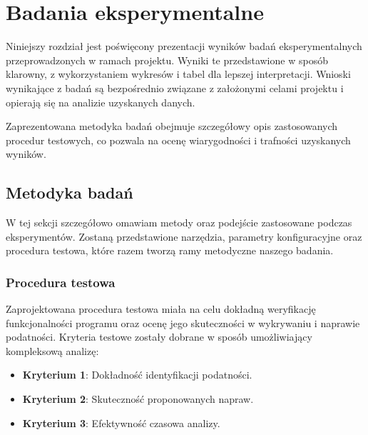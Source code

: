\chapter{Badania eksperymentalne}

Niniejszy rozdział jest poświęcony prezentacji wyników badań eksperymentalnych przeprowadzonych w ramach projektu. Wyniki te przedstawione w sposób klarowny, z wykorzystaniem wykresów i tabel dla lepszej interpretacji. 
Wnioski wynikające z badań są bezpośrednio związane z założonymi celami projektu i opierają się na analizie uzyskanych danych.

Zaprezentowana metodyka badań obejmuje szczegółowy opis zastosowanych procedur testowych, co pozwala na ocenę wiarygodności i trafności uzyskanych wyników.

\section{Metodyka badań}

W tej sekcji szczegółowo omawiam metody oraz podejście zastosowane podczas eksperymentów. 
Zostaną przedstawione narzędzia, parametry konfiguracyjne oraz procedura testowa, które razem tworzą ramy metodyczne naszego badania.

\subsection{Procedura testowa}

Zaprojektowana procedura testowa miała na celu dokładną weryfikację funkcjonalności programu oraz ocenę jego skuteczności w wykrywaniu i naprawie podatności. Kryteria testowe zostały dobrane w sposób umożliwiający kompleksową analizę:

\begin{itemize}
    \item \textbf{Kryterium 1}: Dokładność identyfikacji podatności.
    \item \textbf{Kryterium 2}: Skuteczność proponowanych napraw.
    \item \textbf{Kryterium 3}: Efektywność czasowa analizy.
\end{itemize}


